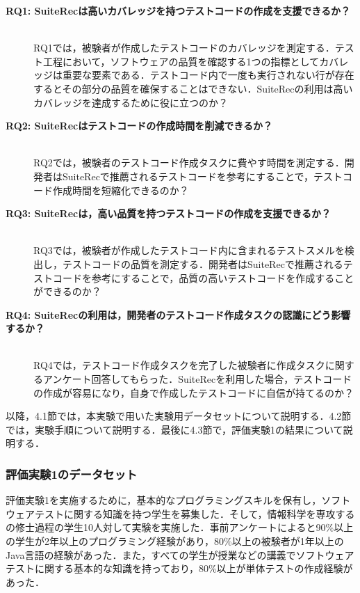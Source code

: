 \documentclass[12pt]{jarticle} %
\begin{document}
\begin{description}
\item[\textbf{RQ1: {\sf SuiteRec}は高いカバレッジを持つテストコードの作成を支援できるか？}]~\\
RQ1では，被験者が作成したテストコードのカバレッジを測定する．テスト工程において，ソフトウェアの品質を確認する1つの指標としてカバレッジは重要な要素である．テストコード内で一度も実行されない行が存在するとその部分の品質を確保することはできない．SuiteRecの利用は高いカバレッジを達成するために役に立つのか？
\item[\textbf{RQ2: {\sf SuiteRec}はテストコードの作成時間を削減できるか？}]~\\
RQ2では，被験者のテストコード作成タスクに費やす時間を測定する．開発者はSuiteRecで推薦されるテストコードを参考にすることで，テストコード作成時間を短縮化できるのか？
\item[\textbf{RQ3: {\sf SuiteRec}は，高い品質を持つテストコードの作成を支援できるか？}]~\\
RQ3では，被験者が作成したテストコード内に含まれるテストスメルを検出し，テストコードの品質を測定する．開発者はSuiteRecで推薦されるテストコードを参考にすることで，品質の高いテストコードを作成することができるのか？
\item[\textbf{RQ4: {\sf SuiteRec}の利用は，開発者のテストコード作成タスクの認識にどう影響するか？}]~\\
RQ4では，テストコード作成タスクを完了した被験者に作成タスクに関するアンケート回答してもらった．SuiteRecを利用した場合，テストコードの作成が容易になり，自身で作成したテストコードに自信が持てるのか？
\end{description}

以降，4.1節では，本実験で用いた実験用データセットについて説明する．4.2節では，実験手順について説明する．最後に4.3節で，評価実験1の結果について説明する．


\subsubsection{評価実験1のデータセット}


評価実験1を実施するために，基本的なプログラミングスキルを保有し，ソフトウェアテストに関する知識を持つ学生を募集した．そして，情報科学を専攻するの修士過程の学生10人対して実験を実施した．事前アンケートによると90\%以上の学生が2年以上のプログラミング経験があり，80\%以上の被験者が1年以上のJava言語の経験があった．また，すべての学生が授業などの講義でソフトウェアテストに関する基本的な知識を持っており，80\%以上が単体テストの作成経験があった．
\end{document}
